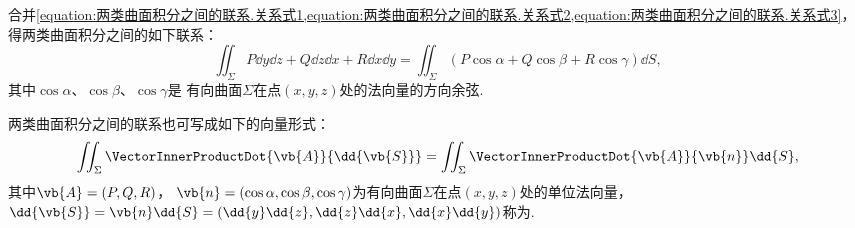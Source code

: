 合并\cref{equation:两类曲面积分之间的联系.关系式1,equation:两类曲面积分之间的联系.关系式2,equation:两类曲面积分之间的联系.关系式3}，
得两类曲面积分之间的如下联系：
\begin{equation}\label{equation:线积分与面积分.两类曲面积分之间的联系}
	\iint_\Sigma P \dd{y}\dd{z} + Q \dd{z}\dd{x} + R \dd{x}\dd{y}
	=\iint_\Sigma (P\cos\alpha+Q\cos\beta+R\cos\gamma) \dd{S},
\end{equation}
其中\(\cos\alpha\)、\(\cos\beta\)、\(\cos\gamma\)是
有向曲面\(\Sigma\)在点\((x,y,z)\)处的法向量的方向余弦.

两类曲面积分之间的联系也可写成如下的向量形式：
\begin{equation}\label{equation:线积分与面积分.两类曲面积分之间的联系的向量形式}
	\iint_\Sigma \VectorInnerProductDot{\vb{A}}{\dd{\vb{S}}}
	=\iint_\Sigma \VectorInnerProductDot{\vb{A}}{\vb{n}} \dd{S},
\end{equation}
其中\(\vb{A}=(P,Q,R)\)，
\(\vb{n}=(\cos\alpha,\cos\beta,\cos\gamma)\)为有向曲面\(\Sigma\)在点\((x,y,z)\)处的单位法向量，
\(\dd{\vb{S}}
= \vb{n}\dd{S}
= (\dd{y}\dd{z},\dd{z}\dd{x},\dd{x}\dd{y})\)称为.

